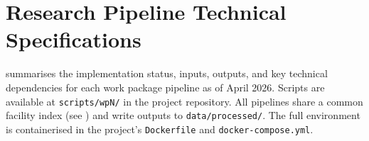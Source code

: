 
\section{Research Pipeline Technical Specifications}
\label{app:pipeline}

 summarises the implementation status, inputs, outputs, and key technical
dependencies for each work package pipeline as of April 2026. Scripts are available at
\texttt{scripts/wpN/} in the project repository. All pipelines share a common facility
index (see ) and write outputs to \texttt{data/processed/}. The full
environment is containerised in the project's \texttt{Dockerfile} and
\texttt{docker-compose.yml}.

